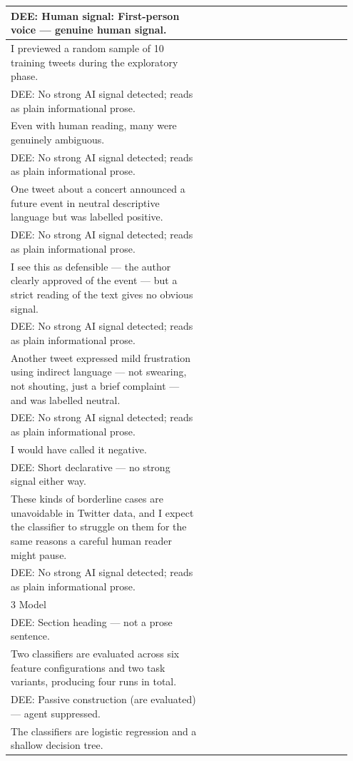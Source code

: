 \documentclass[11pt]{article}
\begin{document}
\begin{longtable}{|p{0.55\linewidth}|p{0.40\linewidth}|}
\hline
DEE: Human signal: First-person voice --- genuine human signal. & \\
\hline
I previewed a random sample of 10 training tweets during the exploratory phase. & \\[2pt]
\hline
DEE: No strong AI signal detected; reads as plain informational prose. & \\
\hline
Even with human reading, many were genuinely ambiguous. & \\[2pt]
\hline
DEE: No strong AI signal detected; reads as plain informational prose. & \\
\hline
One tweet about a concert announced a future event in neutral descriptive language but was labelled positive. & \\[2pt]
\hline
DEE: No strong AI signal detected; reads as plain informational prose. & \\
\hline
I see this as defensible --- the author clearly approved of the event --- but a strict reading of the text gives no obvious signal. & \\[2pt]
\hline
DEE: No strong AI signal detected; reads as plain informational prose. & \\
\hline
Another tweet expressed mild frustration using indirect language --- not swearing, not shouting, just a brief complaint --- and was labelled neutral. & \\[2pt]
\hline
DEE: No strong AI signal detected; reads as plain informational prose. & \\
\hline
I would have called it negative. & \\[2pt]
\hline
DEE: Short declarative --- no strong signal either way. & \\
\hline
These kinds of borderline cases are unavoidable in Twitter data, and I expect the classifier to struggle on them for the same reasons a careful human reader might pause. & \\[2pt]
\hline
DEE: No strong AI signal detected; reads as plain informational prose. & \\
\hline
3 Model & \\[2pt]
\hline
DEE: Section heading --- not a prose sentence. & \\
\hline
Two classifiers are evaluated across six feature configurations and two task variants, producing four runs in total. & \\[2pt]
\hline
DEE: Passive construction (are evaluated) --- agent suppressed. & \\
\hline
The classifiers are logistic regression and a shallow decision tree. & \\[2pt]

\end{longtable}
\end{document}
